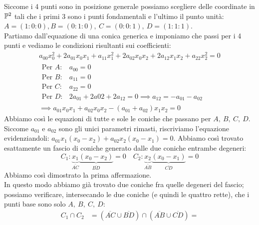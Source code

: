 \begin{demonstration}
	Siccome i 4 punti sono in posizione generale possiamo scegliere delle coordinate in $\proj[2]{\ }$ tali che i primi 3 sono i punti fondamentali e l'ultimo il punto unità: $A=(1\colon0\colon0), B=(0\colon1\colon0),\ C=(0\colon0\colon1),\ D=(1\colon1\colon1)$.\\
	Partiamo dall'equazione di una conica generica e imponiamo che passi per i 4 punti e vediamo le condizioni risultanti sui coefficienti:
		\begin{gather*}
			a_{00}x_0^2+2a_{01}x_0x_1+a_{11}x_1^2+2a_{02}x_0x_2+2a_{12}x_1x_2+a_{22}x_2^2=0\\
			\begin{array}{ll}
				\text{Per } A \colon & a_{00}=0 \\
				\text{Per } B \colon & a_{11}=0 \\
				\text{Per } C \colon & a_{22}=0 \\
				\text{Per } D \colon & 2a_{01}+2a{02}+2a_{12}=0 \implies a_{12}=-a_{01}-a_{02}
			\end{array}\\
			\implies a_{01}x_0x_1+a_{02}x_0x_2-(a_{01}+a_{02})x_1x_2=0
		\end{gather*}
	Abbiamo così le equazioni di tutte e sole le coniche che passano per $A,\ B,\ C,\ D$. Siccome $a_{01}$ e $a_{02}$ sono gli unici parametri rimasti, riscriviamo l'equazione evidenziandoli: $a_{01}x_1(x_0-x_2)+a_{02}x_2(x_0-x_1)=0$. Abbiamo così trovato esattamente un fascio di coniche generato dalle due coniche entrambe degeneri:
		\begin{equation*}
			C_1\colon \underbrace{x_1}_{\overline{AC}} \underbrace{(x_0-x_2)}_{\overline{BD}}=0 \quad
			C_2\colon \underbrace{x_2}_{\overline{AB}} \underbrace{(x_0-x_1)}_{\overline{CD}}=0
		\end{equation*}
	Abbiamo così dimostrato la prima affermazione.\\
	In questo modo abbiamo già trovato due coniche fra quelle degeneri del fascio; possiamo verificare, intersecando le due coniche (e quindi le quattro rette), che i punti base sono solo $A,\ B,\ C,\ D$:
		\begin{equation*}
			\begin{array}{ll}
				C_1\cap C_2  & = (\overline{AC}\cup \overline{BD}) \cap (\overline{AB}\cup\overline{CD}) =\\

\end{array}
\end{equation*}
\end{demonstration}

